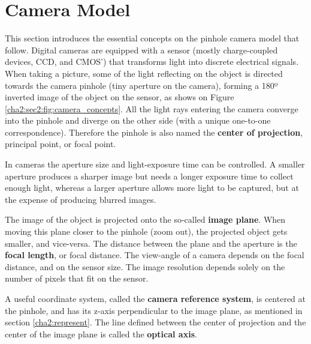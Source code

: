 
\section{Camera Model}
\label{cha2:cameramodel}

This section introduces the essential concepts on the pinhole camera model that follow. Digital cameras are equipped with a sensor (mostly charge-coupled devices, CCD, and CMOS') that transforms light into discrete electrical signals. When taking a picture, some of the light reflecting on the object is directed towards the camera pinhole (tiny aperture on the camera), forming a 180º inverted image of the object on the sensor, as shows on Figure \ref{cha2:sec2:fig:camera_concepts}. All the light rays entering the camera converge into the pinhole and diverge on the other side (with a unique one-to-one correspondence). Therefore the pinhole is also named the \textbf{center of projection}, principal point, or focal point.

In cameras the aperture size and light-exposure time can be controlled. A smaller aperture produces a sharper image but needs a longer exposure time to collect enough light, whereas a larger aperture allows more light to be captured, but at the expense of producing blurred images.

The image of the object is projected onto the so-called \textbf{image plane}. When moving this plane closer to the pinhole (zoom out), the projected object gets smaller, and vice-versa. The distance between the plane and the aperture is the \textbf{focal length}, or focal distance. The view-angle of a camera depends on the focal distance, and on the sensor size. The image resolution depends solely on the number of pixels that fit on the sensor.

A useful coordinate system, called the \textbf{camera reference system}, is centered at the pinhole, and has its z-axis perpendicular to the image plane, as mentioned in section \ref{cha2:represent}. The line defined between the center of projection and the center of the image plane is called the \textbf{optical axis}.

